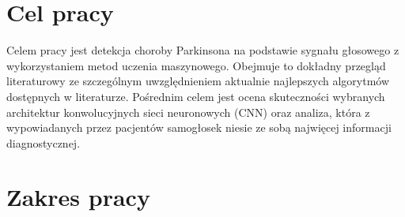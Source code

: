 
\section{Cel pracy}
\label{sec:celPracy}

Celem pracy jest detekcja choroby Parkinsona na podstawie sygnału głosowego z wykorzystaniem metod uczenia maszynowego.
Obejmuje to dokładny przegląd literaturowy ze szczególnym uwzględnieniem aktualnie najlepszych algorytmów
dostępnych w literaturze.
Pośrednim celem jest ocena skuteczności wybranych architektur konwolucyjnych sieci neuronowych (CNN) oraz analiza, która z wypowiadanych przez
pacjentów samogłosek niesie ze sobą najwięcej informacji diagnostycznej.


\section{Zakres pracy}
\label{sec:zakresPracy}
